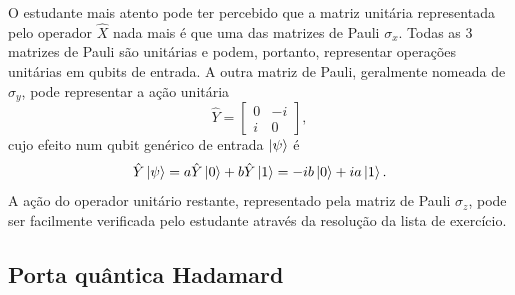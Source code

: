 \documentclass{article}
\begin{document}
O estudante mais atento pode ter percebido que a matriz unitária representada pelo operador $\hat{X}$ nada mais é que uma das matrizes de Pauli $\sigma_x$. Todas as 3 matrizes de Pauli são unitárias e podem, portanto, representar operações unitárias em qubits de entrada. A outra matriz de Pauli, geralmente nomeada de $\sigma_y$, pode representar a ação unitária
\begin{equation}
    \hat{Y} = \begin{bmatrix}
    0 & -i\\
    i & 0
    \end{bmatrix},
\end{equation}
cujo efeito num qubit genérico de entrada $\ket{\psi}$ é
\begin{equation}
    \hat{Y}\ket{\psi} = a\hat{Y}\ket{0} + b \hat{Y}\ket{1} = -ib\ket{0} + ia\ket{1}.
\end{equation}
A ação do operador unitário restante, representado pela matriz de Pauli $\sigma_z$, pode ser facilmente verificada pelo estudante através da resolução da lista de exercício.

\subsection{Porta quântica Hadamard}
\end{document}
